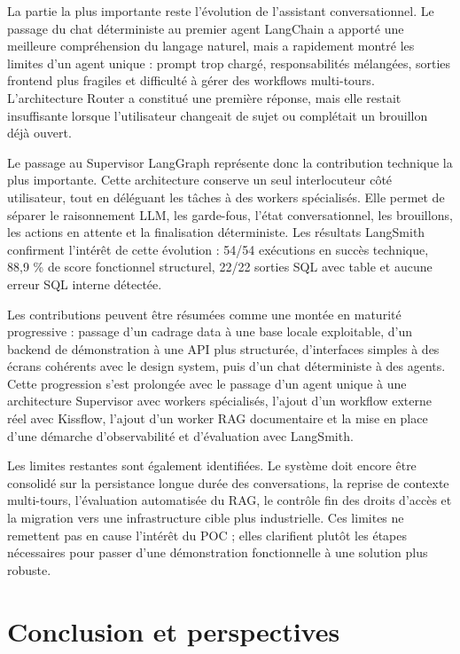 \documentclass[a4paper,11pt,english,openany]{book}
\begin{document}
La partie la plus importante reste l'évolution de l'assistant conversationnel. Le passage du chat déterministe au premier agent LangChain a apporté une meilleure compréhension du langage naturel, mais a rapidement montré les limites d'un agent unique : prompt trop chargé, responsabilités mélangées, sorties frontend plus fragiles et difficulté à gérer des workflows multi-tours. L'architecture Router a constitué une première réponse, mais elle restait insuffisante lorsque l'utilisateur changeait de sujet ou complétait un brouillon déjà ouvert.

Le passage au Supervisor LangGraph représente donc la contribution technique la plus importante. Cette architecture conserve un seul interlocuteur côté utilisateur, tout en déléguant les tâches à des workers spécialisés. Elle permet de séparer le raisonnement LLM, les garde-fous, l'état conversationnel, les brouillons, les actions en attente et la finalisation déterministe. Les résultats LangSmith confirment l'intérêt de cette évolution : 54/54 exécutions en succès technique, 88,9 \% de score fonctionnel structurel, 22/22 sorties SQL avec table et aucune erreur SQL interne détectée.

Les contributions peuvent être résumées comme une montée en maturité progressive : passage d'un cadrage data à une base locale exploitable, d'un backend de démonstration à une API plus structurée, d'interfaces simples à des écrans cohérents avec le design system, puis d'un chat déterministe à des agents. Cette progression s'est prolongée avec le passage d'un agent unique à une architecture Supervisor avec workers spécialisés, l'ajout d'un workflow externe réel avec Kissflow, l'ajout d'un worker RAG documentaire et la mise en place d'une démarche d'observabilité et d'évaluation avec LangSmith.

Les limites restantes sont également identifiées. Le système doit encore être consolidé sur la persistance longue durée des conversations, la reprise de contexte multi-tours, l'évaluation automatisée du RAG, le contrôle fin des droits d'accès et la migration vers une infrastructure cible plus industrielle. Ces limites ne remettent pas en cause l'intérêt du POC ; elles clarifient plutôt les étapes nécessaires pour passer d'une démonstration fonctionnelle à une solution plus robuste.

\chapter{Conclusion et perspectives}
\end{document}

